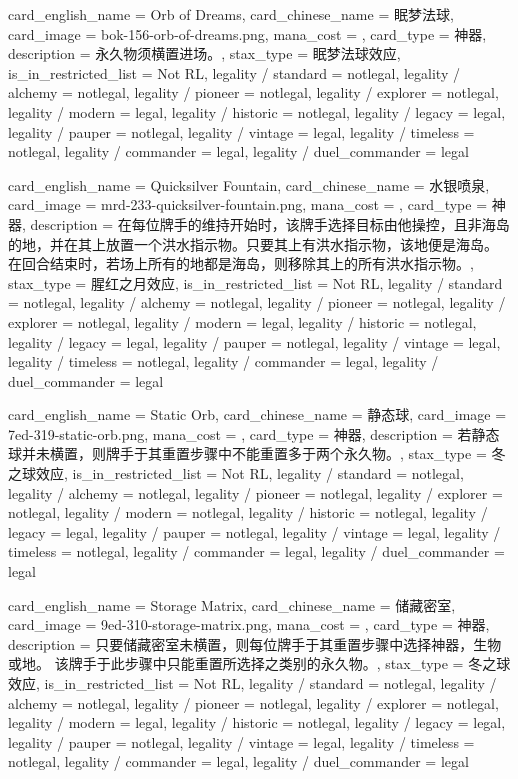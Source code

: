 \documentclass[lang = cn, color = black, 10pt]{AllThatStax}
\begin{document}
\card
{
	card_english_name = {Orb of Dreams},
	card_chinese_name = {眠梦法球},
	card_image = bok-156-orb-of-dreams.png,
	mana_cost = ,
	card_type = 神器,
	description = {永久物须横置进场。},
	stax_type = 眠梦法球效应,
	is_in_restricted_list = Not RL,
	legality / standard = notlegal,
	legality / alchemy = notlegal,
	legality / pioneer = notlegal,
	legality / explorer = notlegal,
	legality / modern = legal,
	legality / historic = notlegal,
	legality / legacy = legal,
	legality / pauper = notlegal,
	legality / vintage = legal,
	legality / timeless = notlegal,
	legality / commander = legal,
	legality / duel_commander = legal
}

\card
{
	card_english_name = {Quicksilver Fountain},
	card_chinese_name = {水银喷泉},
	card_image = mrd-233-quicksilver-fountain.png,
	mana_cost = ,
	card_type = 神器,
	description = {在每位牌手的维持开始时，该牌手选择目标由他操控，且非海岛的地，并在其上放置一个洪水指示物。只要其上有洪水指示物，该地便是海岛。\\
在回合结束时，若场上所有的地都是海岛，则移除其上的所有洪水指示物。},
	stax_type = 腥红之月效应,
	is_in_restricted_list = Not RL,
	legality / standard = notlegal,
	legality / alchemy = notlegal,
	legality / pioneer = notlegal,
	legality / explorer = notlegal,
	legality / modern = legal,
	legality / historic = notlegal,
	legality / legacy = legal,
	legality / pauper = notlegal,
	legality / vintage = legal,
	legality / timeless = notlegal,
	legality / commander = legal,
	legality / duel_commander = legal
}

\card
{
	card_english_name = {Static Orb},
	card_chinese_name = {静态球},
	card_image = 7ed-319-static-orb.png,
	mana_cost = ,
	card_type = 神器,
	description = {若静态球并未横置，则牌手于其重置步骤中不能重置多于两个永久物。},
	stax_type = 冬之球效应,
	is_in_restricted_list = Not RL,
	legality / standard = notlegal,
	legality / alchemy = notlegal,
	legality / pioneer = notlegal,
	legality / explorer = notlegal,
	legality / modern = notlegal,
	legality / historic = notlegal,
	legality / legacy = legal,
	legality / pauper = notlegal,
	legality / vintage = legal,
	legality / timeless = notlegal,
	legality / commander = legal,
	legality / duel_commander = legal
}

\card
{
	card_english_name = {Storage Matrix},
	card_chinese_name = {储藏密室},
	card_image = 9ed-310-storage-matrix.png,
	mana_cost = ,
	card_type = 神器,
	description = {只要储藏密室未横置，则每位牌手于其重置步骤中选择神器，生物或地。 该牌手于此步骤中只能重置所选择之类别的永久物。},
	stax_type = 冬之球效应,
	is_in_restricted_list = Not RL,
	legality / standard = notlegal,
	legality / alchemy = notlegal,
	legality / pioneer = notlegal,
	legality / explorer = notlegal,
	legality / modern = legal,
	legality / historic = notlegal,
	legality / legacy = legal,
	legality / pauper = notlegal,
	legality / vintage = legal,
	legality / timeless = notlegal,
	legality / commander = legal,
	legality / duel_commander = legal
}
\end{document}
